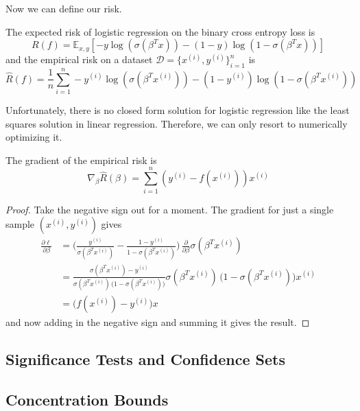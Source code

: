   Now we can define our risk. 

  \begin{theorem}[Risk]
    The expected risk of logistic regression on the binary cross entropy loss is 
    \begin{equation}
      R(f) = \mathbb{E}_{x, y} \left[ -y \log(\sigma(\beta^T x)) - (1 - y) \log(1 - \sigma(\beta^T x)) \right]
    \end{equation} 
    and the empirical risk on a dataset $\mathcal{D} = \{x^{(i)}, y^{(i)}\}_{i=1}^n$ is 
    \begin{equation}
      \hat{R}(f) = \frac{1}{n} \sum_{i=1}^n -y^{(i)} \log(\sigma(\beta^T x^{(i)})) - (1 - y^{(i)}) \log(1 - \sigma(\beta^T x^{(i)}))
    \end{equation}
  \end{theorem}

  Unfortunately, there is no closed form solution for logistic regression like the least squares solution in linear regression. Therefore, we can only resort to numerically optimizing it. 

  \begin{theorem}
    The gradient of the empirical risk is 
    \begin{equation}
      \nabla_\beta \hat{R}(\beta) = \sum_{i=1}^n (y^{(i)} - f(x^{(i)})) x^{(i)}
    \end{equation}
  \end{theorem}
  \begin{proof}
    Take the negative sign out for a moment. The gradient for just a single sample $(x^{(i)}, y^{(i)})$ gives 
    \begin{align}
      \frac{\partial \ell}{\partial \beta}  & = \bigg( \frac{y^{(i)}}{\sigma(\beta^T x^{(i)})} - \frac{1 - y^{(i)}}{1 - \sigma(\beta^T x^{(i)})} \bigg) \, \frac{\partial}{\partial \beta} \sigma (\beta^T x^{(i)}) \\
      & = \frac{\sigma(\beta^T x^{(i)}) - y^{(i)}}{\sigma(\beta^T x^{(i)}) \, \big( 1 - \sigma(\beta^T x^{(i)}) \big)} \sigma(\beta^T x^{(i)}) \, \big( 1 - \sigma(\beta^T x^{(i)}) \big) x^{(i)} \\
      & = \big( f (x^{(i)}) - y^{(i)} \big) x
    \end{align} 
    and now adding in the negative sign and summing it gives the result. 
  \end{proof}

\subsection{Significance Tests and Confidence Sets}

\subsection{Concentration Bounds}

